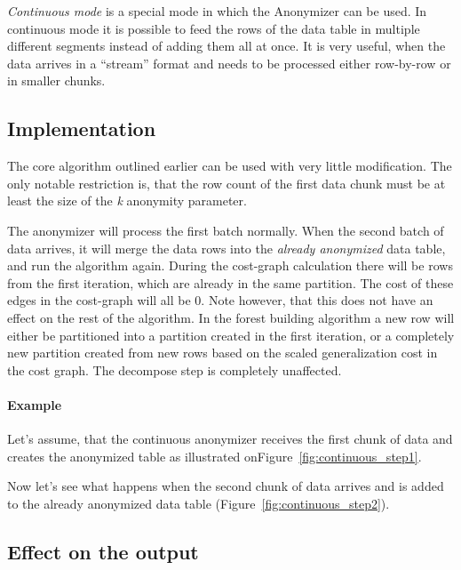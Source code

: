 \emph{Continuous mode} is a special mode in which the Anonymizer can be used. In continuous mode it is possible to feed the rows of the data table in multiple different segments instead of adding them all at once. It is very useful, when the data arrives in a ``stream'' format and needs to be processed either row-by-row or in smaller chunks.

\subsection{Implementation}

The core algorithm outlined earlier can be used with very little modification. The only notable restriction is, that the row count of the first data chunk must be at least the size of the \textit{k} anonymity parameter.

The anonymizer will process the first batch normally. When the second batch of data arrives, it will merge the data rows into the \emph{already anonymized} data table, and run the algorithm again. During the cost-graph calculation there will be rows from the first iteration, which are already in the same partition. The cost of these edges in the cost-graph will all be 0. Note however, that this does not have an effect on the rest of the algorithm. In the forest building algorithm a new row will either be partitioned into a partition created in the first iteration, or a completely new partition created from new rows based on the scaled generalization cost in the cost graph. The decompose step is completely unaffected.

\paragraph{Example}

Let's assume, that the continuous anonymizer receives the first chunk of data and creates the anonymized table as illustrated onFigure~\ref{fig:continuous_step1}.



Now let's see what happens when the second chunk of data arrives and is added to the already anonymized data table (Figure~\ref{fig:continuous_step2}).



\subsection{Effect on the output}

